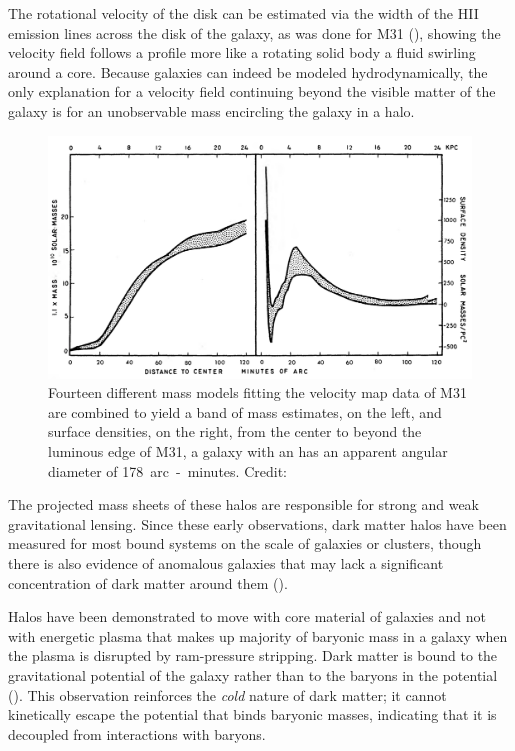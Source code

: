 \documentclass{paper}
\begin{document}
  The rotational velocity of the disk can be estimated via the 
  width of the HII emission lines across the disk of the galaxy, as was done
  for M31 (\cite{1970ApJ...159..379R}), showing the velocity field follows a 
  profile more like a rotating solid body a fluid 
  swirling around a core. Because galaxies can indeed be modeled 
  hydrodynamically, the only explanation for a velocity field continuing 
  beyond the visible matter of the galaxy is for an unobservable mass 
  encircling the galaxy in a halo.

  \begin{figure}[H]
    \begin{centering}
    \includegraphics[scale=0.4]{DM-masscurve.pdf}
    \caption{Fourteen different mass models fitting the velocity map data of
      M31 are combined to yield a band of mass estimates, on the left, and 
      surface densities, on the right, from the center to beyond the luminous 
      edge of M31, a galaxy with an has an apparent angular diameter of 
      \SI{178}{arc-minutes}.
    Credit: \cite{1970ApJ...159..379R}}
    \label{fig:DM-masscurve}
    \end{centering}
  \end{figure}

  The projected mass sheets of these halos are responsible for strong and weak 
  gravitational lensing. Since these early observations, dark matter halos 
  have been measured for most bound systems on the scale of galaxies or 
  clusters, though there is also evidence of anomalous galaxies that may lack 
  a significant concentration of dark matter around them 
  (\cite{10.1093/mnras/stab3491}). 

  Halos have been demonstrated to move with core material of galaxies and not 
  with energetic plasma that makes up majority of baryonic mass in a galaxy when 
  the plasma is disrupted by ram-pressure stripping. 
  Dark matter is bound to the gravitational potential of the galaxy rather 
  than to the baryons in the potential (\cite{Clowe_2006}). This observation 
  reinforces the \textit{cold} nature of dark matter; it cannot kinetically 
  escape the potential that binds baryonic masses, indicating that it 
  is decoupled from interactions with baryons. 
\end{document}
